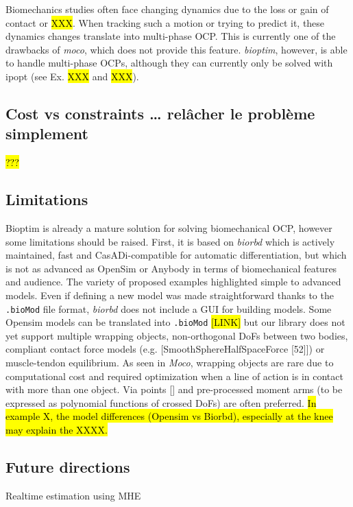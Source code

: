 Biomechanics studies often face changing dynamics due to the loss or gain of contact or \hl{XXX}.
When tracking such a motion or trying to predict it, these dynamics changes translate into multi-phase OCP.
This is currently one of the drawbacks of \textit{moco}, which does not provide this feature.
\textit{bioptim}, however, is able to handle multi-phase OCPs, although they can currently only be solved with ipopt (see Ex. \hl{XXX} and \hl{XXX}).


\subsection{Cost vs constraints … relâcher le problème simplement}

\hl{???}

\subsection{Limitations}

Bioptim is already a mature solution for solving biomechanical OCP, however some limitations should be raised. 
First, it is based on  \textit{biorbd} which is actively maintained, fast and CasADi-compatible for automatic differentiation, but which is not as advanced as OpenSim or Anybody in terms of biomechanical features and audience. 
The variety of proposed examples highlighted simple to advanced models.
Even if defining a new model was made straightforward thanks to the \texttt{.bioMod} file format, \textit{biorbd} does not include a GUI for building models. 
Some Opensim models can be translated into \texttt{.bioMod} \hl{[LINK]} but our library does not yet support multiple wrapping objects, non-orthogonal DoFs between two bodies, compliant contact force models (e.g. [SmoothSphereHalfSpaceForce [52]]) or muscle-tendon equilibrium. 
As seen in \textit{Moco}, wrapping objects are rare due to computational cost and required optimization when a line of action is in contact with more than one object. 
Via points [\addref] and pre-processed moment arms (to be expressed as polynomial functions of crossed DoFs) are often preferred. 
\hl{In example X, the model differences (Opensim vs Biorbd), especially at the knee may explain the XXXX.} 


\subsection{Future directions}
Realtime estimation using MHE

